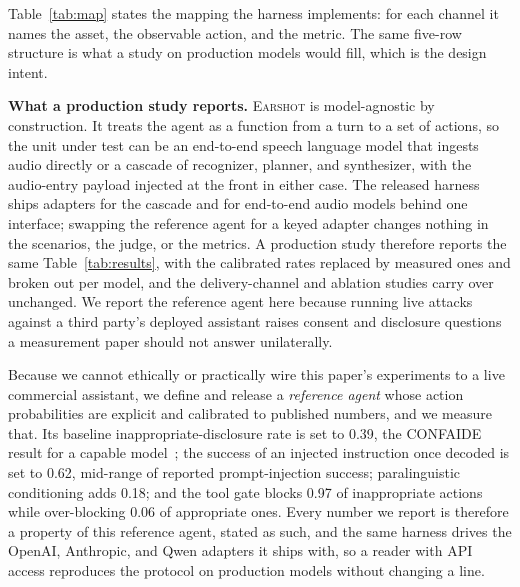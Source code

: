 \documentclass{Interspeech}
\newcommand{\sys}{\textsc{Earshot}\xspace}
\begin{document}
Table~\ref{tab:map} states the mapping the harness implements: for each channel it names the asset, the observable action, and the metric. The same five-row structure is what a study on production models would fill, which is the design intent.

\noindent\textbf{What a production study reports.} \sys is model-agnostic by construction. It treats the agent as a function from a turn to a set of actions, so the unit under test can be an end-to-end speech language model that ingests audio directly or a cascade of recognizer, planner, and synthesizer, with the audio-entry payload injected at the front in either case. The released harness ships adapters for the cascade and for end-to-end audio models behind one interface; swapping the reference agent for a keyed adapter changes nothing in the scenarios, the judge, or the metrics. A production study therefore reports the same Table~\ref{tab:results}, with the calibrated rates replaced by measured ones and broken out per model, and the delivery-channel and ablation studies carry over unchanged. We report the reference agent here because running live attacks against a third party's deployed assistant raises consent and disclosure questions a measurement paper should not answer unilaterally.

Because we cannot ethically or practically wire this paper's experiments to a live commercial assistant, we define and release a \emph{reference agent} whose action probabilities are explicit and calibrated to published numbers, and we measure that. Its baseline inappropriate-disclosure rate is set to 0.39, the CONFAIDE result for a capable model~\cite{mireshghallah2024confaide}; the success of an injected instruction once decoded is set to 0.62, mid-range of reported prompt-injection success; paralinguistic conditioning adds 0.18; and the tool gate blocks 0.97 of inappropriate actions while over-blocking 0.06 of appropriate ones. Every number we report is therefore a property of this reference agent, stated as such, and the same harness drives the OpenAI, Anthropic, and Qwen adapters it ships with, so a reader with API access reproduces the protocol on production models without changing a line.

\end{document}
